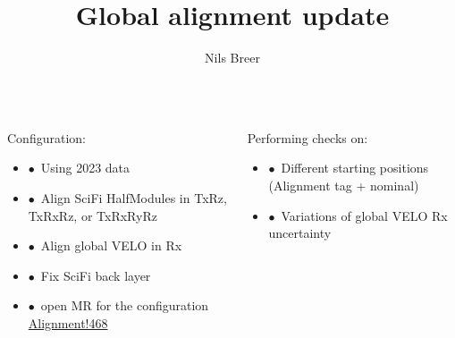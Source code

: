 \documentclass[aspectratio=1610, 12pt]{beamer}
\title{Global alignment update}
\author[N.Breer]{Nils Breer}
\institute{TU Dortmund, AG Albrecht}
\begin{document}
\maketitle

\begin{frame}
  \begin{columns}
    \begin{column}[c]{0.48\textwidth}
      Configuration:
      \begin{itemize}
        \item $\bullet$\, Using 2023 data
        \item $\bullet$\, Align SciFi HalfModules in TxRz, TxRxRz, or TxRxRyRz
        \item $\bullet$\, Align global VELO in Rx
        \item $\bullet$\, Fix SciFi back layer
        \item $\bullet$\, open MR for the configuration \href{https://gitlab.cern.ch/lhcb/Alignment/-/merge_requests/468}{Alignment!468}
      \end{itemize}
    \end{column}
    \begin{column}[c]{0.48\textwidth}
      Performing checks on:
      \begin{itemize}
        \item $\bullet$\, Different starting positions (Alignment tag + nominal)
        \item $\bullet$\, Variations of global VELO Rx uncertainty
      \end{itemize}
    \end{column}
  \end{columns}
\end{frame}
\end{document}

